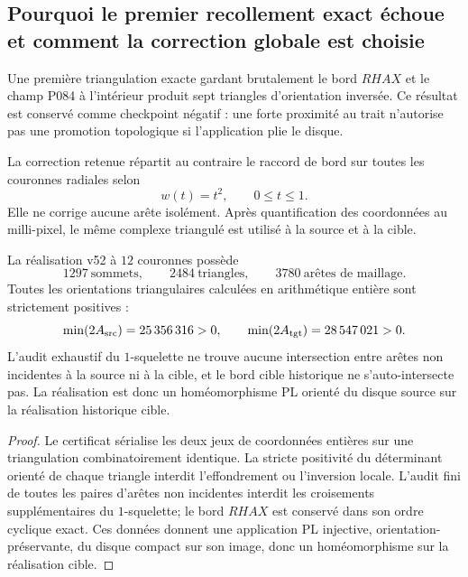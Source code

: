 \subsection{Pourquoi le premier recollement exact échoue et comment la correction globale est choisie}

Une première triangulation exacte gardant brutalement le bord $RHAX$ et le champ P084 à l'intérieur produit sept triangles d'orientation inversée. Ce résultat est conservé comme checkpoint négatif : une forte proximité au trait n'autorise pas une promotion topologique si l'application plie le disque.

La correction retenue répartit au contraire le raccord de bord sur toutes les couronnes radiales selon
\[
 \boxed{w(t)=t^2,\qquad 0\le t\le1.}
\]
Elle ne corrige aucune arête isolément. Après quantification des coordonnées au milli-pixel, le même complexe triangulé est utilisé à la source et à la cible.

\begin{theorem}\label{thm:v52-exact-PL}
La réalisation v52 à $12$ couronnes possède
\[
 \boxed{1297\ \text{sommets},\qquad2484\ \text{triangles},\qquad3780\ \text{arêtes de maillage}.}
\]
Toutes les orientations triangulaires calculées en arithmétique entière sont strictement positives :
\[
 \min(2A_{\rm src})=25\,356\,316>0,
 \qquad
 \min(2A_{\rm tgt})=28\,547\,021>0.
\]
L'audit exhaustif du $1$-squelette ne trouve aucune intersection entre arêtes non incidentes à la source ni à la cible, et le bord cible historique ne s'auto-intersecte pas. La réalisation est donc un homéomorphisme PL orienté du disque source sur la réalisation historique cible.
\end{theorem}

\begin{proof}
Le certificat  sérialise les deux jeux de coordonnées entières sur une triangulation combinatoirement identique. La stricte positivité du déterminant orienté de chaque triangle interdit l'effondrement ou l'inversion locale. L'audit fini de toutes les paires d'arêtes non incidentes interdit les croisements supplémentaires du $1$-squelette; le bord $RHAX$ est conservé dans son ordre cyclique exact. Ces données donnent une application PL injective, orientation-préservante, du disque compact sur son image, donc un homéomorphisme sur la réalisation cible.
\end{proof}

